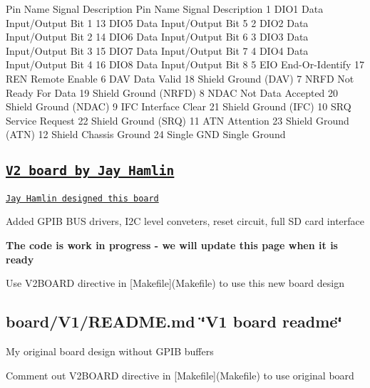 \begin{DoxyPre}
    Pin Name   Signal Description       Pin Name   Signal Description 
    1   DIO1   Data Input/Output Bit 1  13  DIO5   Data Input/Output Bit 5 
    2   DIO2   Data Input/Output Bit 2  14  DIO6   Data Input/Output Bit 6 
    3   DIO3   Data Input/Output Bit 3  15  DIO7   Data Input/Output Bit 7 
    4   DIO4   Data Input/Output Bit 4  16  DIO8   Data Input/Output Bit 8 
    5   EIO    End-Or-Identify          17  REN    Remote Enable 
    6   DAV    Data Valid               18  Shield Ground (DAV) 
    7   NRFD   Not Ready For Data       19  Shield Ground (NRFD) 
    8   NDAC   Not Data Accepted        20  Shield Ground (NDAC) 
    9   IFC    Interface Clear          21  Shield Ground (IFC) 
    10  SRQ    Service Request          22  Shield Ground (SRQ) 
    11  ATN    Attention                23  Shield Ground (ATN) 
    12  Shield Chassis Ground           24  Single GND Single Ground
\end{DoxyPre}


\subsection*{\href{board/V2/release}{\tt V2 board by Jay Hamlin}}


\begin{DoxyItemize}
\item \href{board/V2/releases}{\tt Jay Hamlin designed this board}
\item Added G\+P\+IB B\+US drivers, I2C level conveters, reset circuit, full SD card interface
\item {\bfseries The code is work in progress -\/ we will update this page when it is ready}
\item Use V2\+B\+O\+A\+RD directive in \mbox{[}Makefile\mbox{]}(Makefile) to use this new board design 


\end{DoxyItemize}

\subsection*{board/\+V1/\+R\+E\+A\+D\+M\+E.\+md \char`\"{}\+V1 board readme\char`\"{}}


\begin{DoxyItemize}
\item My original board design without G\+P\+IB buffers
\item Comment out V2\+B\+O\+A\+RD directive in \mbox{[}Makefile\mbox{]}(Makefile) to use original board 


\end{DoxyItemize}

